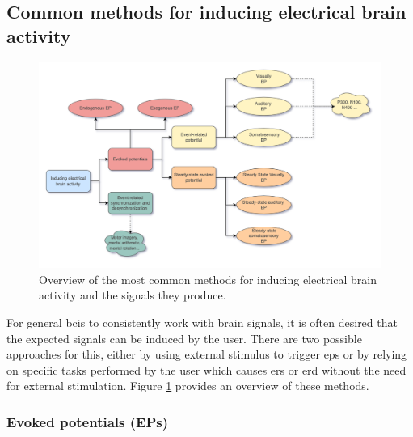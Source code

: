 
\subsection{Common methods for inducing electrical brain activity}
\label{subsec:biomedical_signals_working_with_eeg_inducing_methods}


\begin{figure}[ht]
    \centering
    \includegraphics[width=\linewidth]{../images/biosignals/brain_signal_inducing_methods.pdf}
    \captionsetup{width=0.8\linewidth}
    \captionsetup{justification=centering}
    \caption{Overview of the most common methods for inducing electrical brain activity and the signals they produce.}
    \label{fig:biomedical_signals_inducing_methods}
\end{figure}



For general \glspl{bci} to consistently work with brain signals, it is often desired that the expected signals can be induced by the user.
There are two possible approaches for this, either by using external stimulus to trigger \glspl{ep} or by relying on specific tasks performed by the user which causes \gls{ers} or \gls{erd} without the need for external stimulation.
Figure \ref{fig:biomedical_signals_inducing_methods} provides an overview of these methods.


\subsubsection{Evoked potentials (EPs)}
\label{subsubsec:biomedical_signals_working_with_eeg_inducing_methods_ep}

